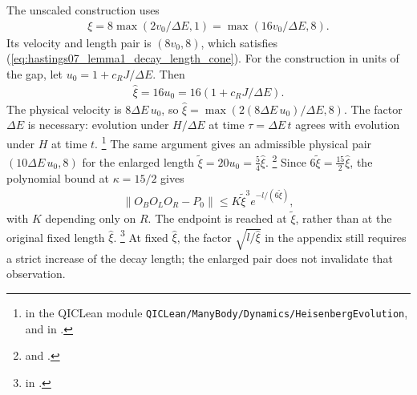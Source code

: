 \documentclass{article}
\begin{document}
The unscaled construction uses
\begin{align}
    \xi=8\max(2v_0/\Delta E,1)=\max(16v_0/\Delta E,8).
    \label{eq:hastings07_lemma1_decay_length_value}
\end{align}
Its velocity and length pair is $(8v_0,8)$, which satisfies
(\ref{eq:hastings07_lemma1_decay_length_cone}).
For the construction in units of the gap, let
$u_0=1+c_RJ/\Delta E$. Then
\begin{align}
    \hat\xi=16u_0=16(1+c_RJ/\Delta E).
    \label{eq:hastings07_lemma1_decay_length_scaled}
\end{align}
The physical velocity is $8\Delta E\,u_0$, so
$\hat\xi=\max(2(8\Delta E\,u_0)/\Delta E,8)$.
The factor $\Delta E$ is necessary: evolution under $H/\Delta E$ at time
$\tau=\Delta E\,t$ agrees with evolution under $H$ at time $t$.%
\footnote{
    in the QICLean module \texttt{QICLean/ManyBody/Dynamics/HeisenbergEvolution}, and
    in .}
The same argument gives an admissible physical pair
$(10\Delta E\,u_0,8)$ for the enlarged length
$\tilde\xi=20u_0=\tfrac54\hat\xi$.%
\footnote{
    and .}
Since $6\tilde\xi=\tfrac{15}2\hat\xi$, the polynomial bound at
$\kappa=15/2$ gives
\begin{align}
    \|O_BO_LO_R-P_0\|\le K\tilde\xi^3e^{-l/(6\tilde\xi)},
    \label{eq:hastings07_lemma1_decay_length_endpoint}
\end{align}
with $K$ depending only on $R$. The endpoint is reached at
$\tilde\xi$, rather than at the original fixed length $\hat\xi$.%
\footnote{
    in .}
At fixed $\hat\xi$, the factor $\sqrt{l/\hat\xi}$ in the appendix still
requires a strict increase of the decay length; the enlarged pair does
not invalidate that observation.
\end{document}

